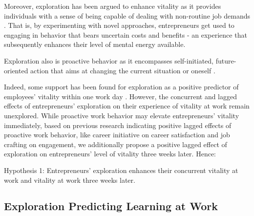 \documentclass[man, 12pt, a4paper, noextraspace]{apa6}
\begin{document}
Moreover, exploration has been argued to enhance vitality as it provides individuals with a sense of being capable of dealing with non-routine job demands \parencite{Daniels2009, Niessen.2012}.
That is, by experimenting with novel approaches, entrepreneurs get used to engaging in behavior that bears uncertain costs and benefits - an experience that subsequently enhances their level of mental energy available. 

Exploration also is proactive behavior as it encompasses self-initiated, future-oriented action that aims at changing the current situation or oneself \parencite{Crant.2000}. 

Indeed, some support has been found for exploration as a positive predictor of employees' vitality within one work day \textcite{Niessen.2012}.
However, the concurrent and lagged effects of entrepreneurs' exploration on their experience of vitality at work remain unexplored. 
While proactive work behavior may elevate entrepreneurs' vitality immediately, based on previous research indicating positive lagged effects of proactive work behavior, like career initiative on career satisfaction \parencite[e.g.,]{Seibert.2001} and job crafting on engagement, we additionally propose a positive lagged effect of exploration on entrepreneurs' level of vitality three weeks later. 
Hence: \par 

Hypothesis 1: Entrepreneurs' exploration enhances their concurrent vitality at work and vitality at work three weeks later. \par 

\subsection{Exploration Predicting Learning at Work}
\end{document}
